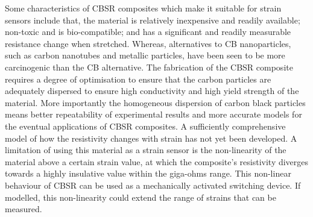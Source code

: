 Some characteristics of CBSR composites which make it suitable for strain sensors include that, the material is relatively inexpensive and readily available; non-toxic and is bio-compatible; and has a significant and readily measurable resistance change when stretched. Whereas, alternatives to CB nanoparticles, such as carbon nanotubes\cite{Maddipatla2017,Wang2013} and metallic particles\cite{Quinsaat2015,Racles2021}, have been seen to be more carcinogenic than the CB alternative\cite{Fukushima2018,Ferdous2020,Rausch2004}. The fabrication of the CBSR composite requires a degree of optimisation to ensure that the carbon particles are adequately dispersed to ensure high conductivity and high yield strength of the material. More importantly the homogeneous dispersion of carbon black particles means better repeatability of experimental results and more accurate models for the eventual applications of CBSR composites. A sufficiently comprehensive model of how the resistivity changes with strain has not yet been developed. A limitation of using this material as a strain sensor is the non-linearity of the material above a certain strain value, at which the composite's resistivity diverges towards a highly insulative value within the giga-ohms range. This non-linear behaviour of CBSR can be used as a mechanically activated switching device\cite{Henke2018}. If modelled, this non-linearity could extend the range of strains that can be measured.

